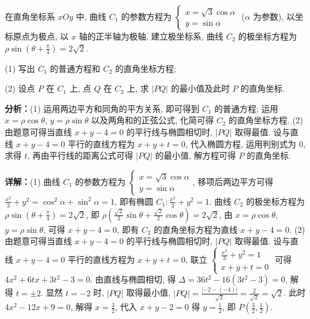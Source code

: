 \begin{question}[points=10]
[选修4-4：坐标系与参数方程]

在直角坐标系 $xOy$ 中, 曲线 $C_1$ 的参数方程为 $\begin{cases}x=\sqrt{3}\cos\alpha\\ y=\sin\alpha\end{cases}$ ($\alpha$ 为参数), 以坐标原点为极点, 以 $x$ 轴的正半轴为极轴, 建立极坐标系, 曲线 $C_2$ 的极坐标方程为 $\rho\sin(\theta+\frac{\pi}{4})=2\sqrt{2}$.

(1) 写出 $C_1$ 的普通方程和 $C_2$ 的直角坐标方程;

(2) 设点 $P$ 在 $C_1$ 上, 点 $Q$ 在 $C_2$ 上, 求 $|PQ|$ 的最小值及此时 $P$ 的直角坐标.
\begin{solution}

\textbf{分析：}(1) 运用两边平方和同角的平方关系, 即可得到 $C_1$ 的普通方程; 运用 $x=\rho\cos\theta$, $y=\rho\sin\theta$ 以及两角和的正弦公式, 化简可得 $C_2$ 的直角坐标方程. (2) 由题意可得当直线 $x+y-4=0$ 的平行线与椭圆相切时, $|PQ|$ 取得最值. 设与直线 $x+y-4=0$ 平行的直线方程为 $x+y+t=0$, 代入椭圆方程, 运用判别式为 $0$, 求得 $t$, 再由平行线的距离公式可得 $|PQ|$ 的最小值, 解方程可得 $P$ 的直角坐标.

\textbf{详解：}(1) 曲线 $C_1$ 的参数方程为 $\begin{cases}x=\sqrt{3}\cos\alpha\\ y=\sin\alpha\end{cases}$, 移项后两边平方可得 $\frac{x^2}{3}+y^2=\cos^2\alpha+\sin^2\alpha=1$, 即有椭圆 $C_1:\frac{x^2}{3}+y^2=1$. 曲线 $C_2$ 的极坐标方程为 $\rho\sin(\theta+\frac{\pi}{4})=2\sqrt{2}$, 即 $\rho(\frac{\sqrt{2}}{2}\sin\theta+\frac{\sqrt{2}}{2}\cos\theta)=2\sqrt{2}$, 由 $x=\rho\cos\theta$, $y=\rho\sin\theta$, 可得 $x+y-4=0$, 即有 $C_2$ 的直角坐标方程为直线 $x+y-4=0$.
(2) 由题意可得当直线 $x+y-4=0$ 的平行线与椭圆相切时, $|PQ|$ 取得最值. 设与直线 $x+y-4=0$ 平行的直线方程为 $x+y+t=0$, 联立 $\begin{cases}\frac{x^2}{3}+y^2=1\\x+y+t=0\end{cases}$ 可得 $4x^2+6tx+3t^2-3=0$. 由直线与椭圆相切, 得 $\Delta=36t^2-16(3t^2-3)=0$, 解得 $t=\pm2$. 显然 $t=-2$ 时, $|PQ|$ 取得最小值, $|PQ|=\frac{|-2-(-4)|}{\sqrt{2}}=\frac{2}{\sqrt{2}}=\sqrt{2}$. 此时 $4x^2-12x+9=0$, 解得 $x=\frac{3}{2}$, 代入 $x+y-2=0$ 得 $y=\frac{1}{2}$, 即 $P(\frac{3}{2},\frac{1}{2})$.
\end{solution}
\end{question}

